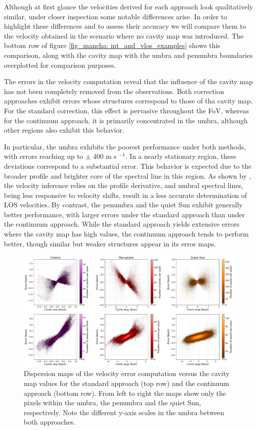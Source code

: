 Although at first glance the velocities derived for each approach look qualitatively similar, under closer inspection some notable differences arise. In order to highlight these differences and to assess their accuracy we will compare them to the velocity obtained in the scenario where no cavity map was introduced. The bottom row of figure \ref{fig_mancha: int_and_vlos_examples} shows this comparison, along with the cavity map with the umbra and penumbra boundaries overplotted for comparison purposes.

The errors in the velocity computation reveal that the influence of the cavity map has not been completely removed from the observations. Both correction approaches exhibit errors whose structures correspond to those of tha cavity map. For the standard correction, this effect is pervasive throughout the FoV, whereas for the continuum approach, it is primarily concentrated in the umbra, although other regions also exhibit this behavior.

In particular, the umbra exhibits the poorest performance under both methods, with errors reaching up to $\pm$ 400 m s $^{-1}$. In a nearly stationary region, these deviations correspond to a substantial error. This behavior is expected due to the broader profile and brighter core of the spectral line in this region. As shown by \cite{solana2005sensitivity}, the velocity inference relies on the profile derivative, and umbral spectral lines, being less responsive to velocity shifts, result in a less accurate determination of LOS velocities. By contrast, the penumbra and the quiet Sun exhibit generally better performance, with larger errors under the standard approach than under the continuum approach. While the standard approach yields extensive errors where the cavity map has high values, the continuum approach tends to perform better, though similar but weaker structures appear in its error maps.

\begin{figure}[t]
  \includegraphics[width=\textwidth]{figures/Mancha/dispersion_maps.pdf}
  \caption[Velocity errors dispersion maps.]{
  Dispersion maps of the velocity error computation versus the cavity map values for the standard approach (top row) and the continuum approach (bottom row). From left to right the maps show only the pixels within the umbra, the penumbra and the quiet Sun, respectively. Note the different y-axis scales in the umbra between both approaches. \label{fig_mancha: dispersion_maps}}
\end{figure}

